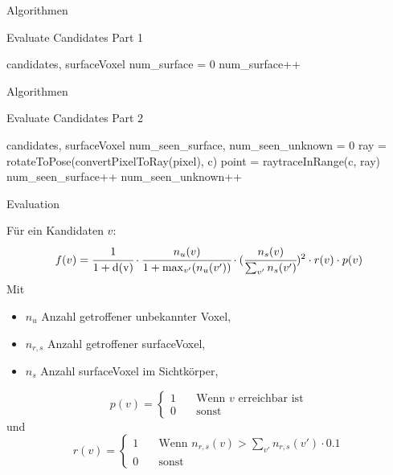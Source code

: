 \documentclass{beamer}
\begin{document}
\begin{frame}{Algorithmen}
	\begin{algorithm}[H]
		\caption{Evaluate Candidates Part 1}
		\begin{algorithmic}[2]
			\Require candidates, surfaceVoxel
			\State num\_surface = 0
			\State num\_surface++
			\EndIf
			\EndFor
			\EndFor

		\end{algorithmic}
	\end{algorithm}

\end{frame}

\begin{frame}{Algorithmen}
	\begin{algorithm}[H]
		\caption{Evaluate Candidates Part 2}
		\begin{algorithmic}[2]
			\Require candidates, surfaceVoxel
			\State num\_seen\_surface, num\_seen\_unknown = 0
			\State ray = rotateToPose(convertPixelToRay(pixel), c)
			\State point = {\color{blue}raytraceInRange(c, ray)}
			\State num\_seen\_surface++
			\EndIf
			\State num\_seen\_unknown++
			\EndIf
			\EndFor
			\EndFor

		\end{algorithmic}
	\end{algorithm}

\end{frame}

\begin{frame}{Evaluation}
	\begin{block}{}
		Für ein Kandidaten $v$:
		\[f(v) = \cfrac{1}{1 + \text{d(v)}} \cdot \cfrac{n_u(v)}{1 + \max_{v'}(n_{u}(v'))} \cdot (\cfrac{n_s(v)}{\sum_{v'}n_s(v')})^2 \cdot r(v) \cdot p(v)\]
		Mit
		\begin{itemize}
			\item $n_u$ Anzahl getroffener unbekannter Voxel,
			\item $n_{r,s}$ Anzahl getroffener surfaceVoxel,
			\item $n_s$ Anzahl surfaceVoxel im Sichtkörper,
		\end{itemize}
		\[p(v) = \begin{cases}
				1 & \quad \text{Wenn } v \text{ erreichbar ist} \\
				0 & \quad \text{sonst}
			\end{cases}\]
		und \[r(v) = \begin{cases}
				1 & \quad \text{Wenn } n_{r,s}(v) > \sum_{v'} n_{r,s}(v') \cdot 0.1 \\
				0 & \quad \text{sonst}
			\end{cases}
		\]
	\end{block}
\end{frame}
\end{document}
